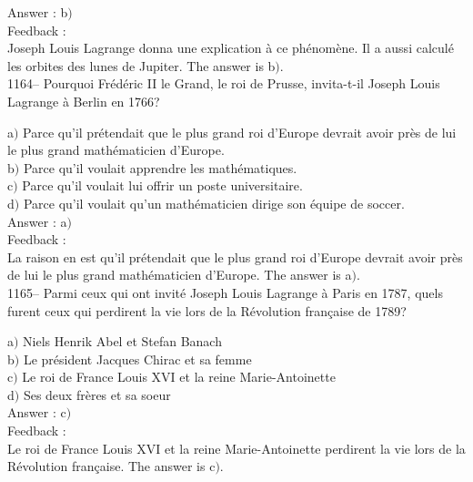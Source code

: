\documentclass[letterpaper, 12pt]{article}
\begin{document}
Answer : b$)$\\

Feedback : \\
Joseph Louis Lagrange donna une explication \`a ce ph\'enom\`ene. Il
a aussi calcul\'e les orbites des lunes de Jupiter.
The answer is b$)$.\\













1164-- Pourquoi Fr\'ed\'eric II le Grand, le roi de Prusse,
invita-t-il Joseph Louis Lagrange \`a Berlin en 1766?

a$)$ Parce qu'il pr\'etendait que \og le plus grand roi d'Europe
devrait avoir pr\`es de lui le plus grand math\'ematicien d'Europe\fg . \\
b$)$ Parce qu'il voulait apprendre les math\'ematiques. \\
c$)$ Parce qu'il voulait lui offrir un poste universitaire. \\
d$)$ Parce qu'il voulait qu'un math\'ematicien dirige son \'equipe de
soccer. \\

Answer : a$)$\\

Feedback : \\
La raison en est qu'il pr\'etendait que \og le plus grand roi
d'Europe devrait avoir pr\`es de lui le plus grand math\'ematicien
d'Europe\fg .
The answer is a$)$.\\

1165-- Parmi ceux qui ont invit\'e Joseph Louis Lagrange \`a Paris
en 1787, quels furent ceux qui perdirent la vie lors de la
R\'evolution fran\c caise de 1789?

a$)$ Niels Henrik Abel et Stefan Banach \\
b$)$ Le pr\'esident Jacques Chirac et sa femme \\
c$)$ Le roi de France Louis XVI et la reine Marie-Antoinette \\
d$)$ Ses deux fr\`eres et sa soeur \\

Answer : c$)$\\

Feedback : \\
Le roi de France Louis XVI et la reine Marie-Antoinette perdirent la vie
lors de la R\'evolution fran\c caise.
The answer is c$)$.\\
\end{document}
